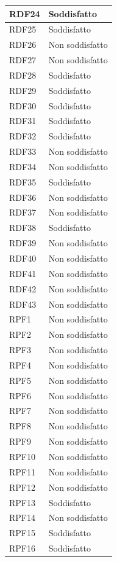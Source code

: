 \begin{longtable}{| p{2.5cm} | p{3cm} |}
	RDF24 & Soddisfatto \\ \hline
	RDF25 & Soddisfatto\\ \hline
	RDF26 & Non soddisfatto\\ \hline
	RDF27 & Non soddisfatto\\ \hline
	RDF28 & Soddisfatto \\ \hline
	RDF29 & Soddisfatto \\ \hline
	RDF30 & Soddisfatto \\ \hline
	RDF31 & Soddisfatto \\ \hline
	RDF32 & Soddisfatto \\ \hline
	RDF33 & Non soddisfatto\\ \hline
	RDF34 & Non soddisfatto \\ \hline
	RDF35 & Soddisfatto \\ \hline
	RDF36 & Non soddisfatto \\ \hline
	RDF37 & Non soddisfatto \\ \hline
	RDF38 & Soddisfatto \\ \hline
	RDF39 & Non soddisfatto \\ \hline
	RDF40 & Non soddisfatto \\ \hline
	RDF41 & Non soddisfatto \\ \hline
	RDF42 & Non soddisfatto \\ \hline
	RDF43 & Non soddisfatto \\ \hline
	RPF1 & Non soddisfatto \\ \hline
	RPF2 & Non soddisfatto \\ \hline
	RPF3 & Non soddisfatto \\ \hline
	RPF4 & Non soddisfatto \\ \hline
	RPF5 & Non soddisfatto \\ \hline
	RPF6 & Non soddisfatto \\ \hline
	RPF7 & Non soddisfatto \\ \hline
	RPF8 & Non soddisfatto \\ \hline
	RPF9 & Non soddisfatto \\ \hline
	RPF10 & Non soddisfatto \\ \hline
	RPF11 & Non soddisfatto \\ \hline
	RPF12 & Non soddisfatto \\ \hline
	RPF13 & Soddisfatto \\ \hline
	RPF14 & Non soddisfatto \\ \hline
	RPF15 & Soddisfatto \\ \hline
	RPF16 & Soddisfatto \\ \hline

\end{longtable}
